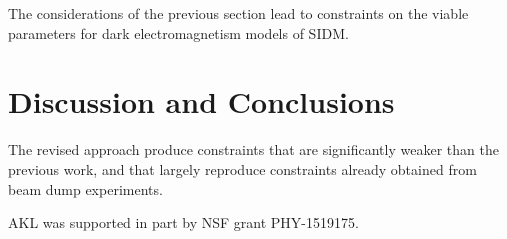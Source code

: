 \documentclass[nofootinbib,prd,superscriptaddress,twocolumn]{revtex4}
\begin{document}
The considerations of the previous section lead to constraints on the 
viable parameters for dark electromagnetism models of SIDM. 



\section{Discussion and Conclusions}
\label{section:conclusions}


	The revised approach produce constraints that are significantly weaker than the previous work, and that largely reproduce constraints already obtained from beam dump experiments. 




\acknowledgments

AKL was supported in part by NSF grant PHY-1519175.



\end{document}
